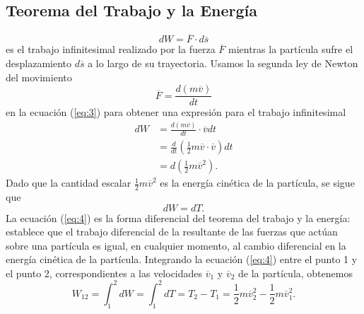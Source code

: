 \documentclass[11pt,a4paper]{article}
\begin{document}
\subsection{Teorema del Trabajo y la Energía}

\begin{equation}
dW = \overline{F} \cdot d\overline{s} \label{eq:3}
\end{equation}
es el trabajo infinitesimal realizado por la fuerza $\overline{F}$ mientras la partícula sufre el desplazamiento $d\overline{s}$ a lo largo de su trayectoria. Usamos la segunda ley de Newton del movimiento
\begin{equation}
\overline{F} = \frac{d(m\overline{v})}{dt}
\end{equation}
en la ecuación (\ref{eq:3}) para obtener una expresión para el trabajo infinitesimal
\begin{align*}
dW &= \frac{d(m\overline{v})}{dt} \cdot \overline{v}dt \\
&= \frac{d}{dt}\left(\frac{1}{2}m\overline{v}\cdot\overline{v}\right)dt \\
&= d\left(\frac{1}{2}m\overline{v}^{2}\right).
\end{align*}
Dado que la cantidad escalar $\frac{1}{2}m\overline{v}^{2}$ es la energía cinética de la partícula, se sigue que
\begin{equation}
dW = dT. \label{eq:4}
\end{equation}
La ecuación (\ref{eq:4}) es la forma diferencial del teorema del trabajo y la energía: establece que el trabajo diferencial de la resultante de las fuerzas que actúan sobre una partícula es igual, en cualquier momento, al cambio diferencial en la energía cinética de la partícula. Integrando la ecuación (\ref{eq:4}) entre el punto 1 y el punto 2, correspondientes a las velocidades $\overline{v}_1$ y $\overline{v}_2$ de la partícula, obtenemos
\begin{equation}
W_{12} = \int_{1}^{2} dW = \int_{1}^{2} dT = T_2 - T_1 = \frac{1}{2}m\overline{v}_{2}^{2} - \frac{1}{2}m\overline{v}_{1}^{2}. \label{eq:5}
\end{equation}
\end{document}
